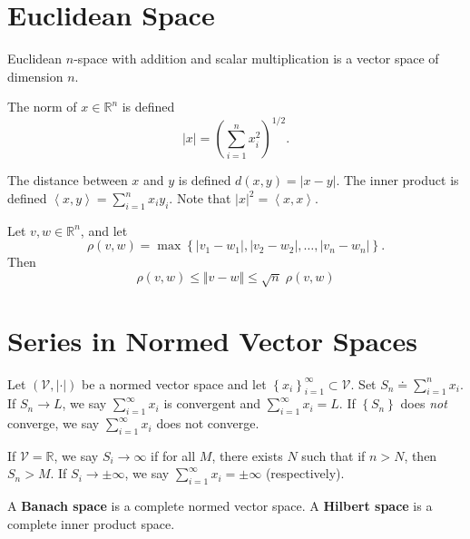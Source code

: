 \documentclass[twoside,10pt]{report}
\begin{document}

\section{Euclidean Space}

\begin{thrm}[]
	Euclidean $n$-space with addition and scalar multiplication is a vector space of dimension $n$.
\end{thrm}

The norm of $x \in \mathbb{R}^n$ is defined
\[
	|x| = \left( \sum_{i=1}^{n} x_i^2 \right)^{1/2}.
\] 

The distance between $x$ and $y$ is defined $d(x,y) = |x-y|$. The inner product is defined $\left\langle x,y \right\rangle = \sum_{i=1}^{n} x_i y_i$. Note that $|x|^2 = \left\langle x,x \right\rangle$.

\begin{prop}
	Let $v,w \in \mathbb{R}^n$, and let
	\[
		\rho(v,w) = \max \left\{ |v_1-w_1|, |v_2-w_2|, \dots, |v_n-w_n| \right\}.
	\]
	Then
	 \[
		 \rho(v,w) \leq \Vert{v-w}\Vert \leq \sqrt{n} \; \rho(v,w)
	\] 
\end{prop}


\section{Series in Normed Vector Spaces}

Let $(\mathcal{V},|\cdot|)$ be a normed vector space and let $\left\{ x_i \right\}_{i=1}^\infty\subset \mathcal{V}$. Set $S_n \doteq \sum_{i=1}^{n} x_i$. If $S_n \to L$, we say $\sum_{i=1}^{\infty} x_i$ is convergent and $\sum_{i=1}^{\infty} x_i = L$. If $\left\{ S_n \right\}$ does \textit{not} converge, we say $\sum_{i=1}^{\infty} x_i$ does not converge.

If $\mathcal{V}=\mathbb{R}$, we say $S_i \to \infty$ if for all $M$, there exists $N$ such that if $n  >N$, then $S_n > M$. If $S_i \to \pm \infty$, we say $\sum_{i=1}^{\infty} x_i = \pm\infty$ (respectively).

\begin{defn}[]
A \textbf{Banach space} is a complete normed vector space. A \textbf{Hilbert space} is a complete inner product space.
\end{defn}
\end{document}
